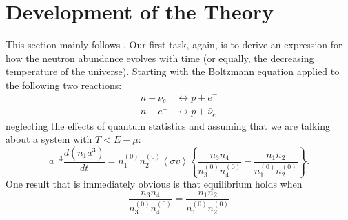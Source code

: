 \documentclass[aps,reprint,prl]{revtex4-1}
\begin{document}
\section*{Development of the Theory}
This section mainly follows \cite{Dodelson,NIU}.  Our first task, again, is to derive an expression for how the neutron abundance evolves with time (or equally, the decreasing temperature of the universe).  Starting with the Boltzmann equation applied to the following two reactions:
\begin{align*}
n+\nu_e&\leftrightarrow p+e^- \\
n+e^+&\leftrightarrow p+\bar{\nu}_e
\end{align*}
neglecting the effects of quantum statistics and assuming that we are talking about a system with $T<E-\mu$:
\begin{equation}
a^{-3}\frac{d\left(n_1a^3\right)}{dt}=n_1^{(0)}n_2^{(0)}\left<\sigma v\right>\left\{\frac{n_3n_4}{n_3^{(0)}n_4^{(0)}}-\frac{n_1n_2}{n_1^{(0)}n_2^{(0)}}\right\} .
\end{equation}
One result that is immediately obvious is that equilibrium holds when
\begin{equation}
\frac{n_3n_4}{n_3^{(0)}n_4^{(0)}}=\frac{n_1n_2}{n_1^{(0)}n_2^{(0)}}
\end{equation}


\end{document}
